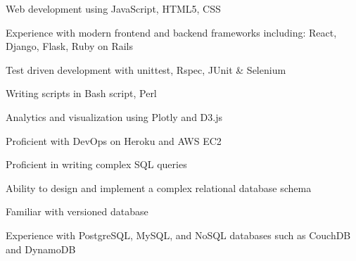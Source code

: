 




\begin{cvparagraph}

      \begin{cvitems}
        \item Web development using JavaScript, HTML5, CSS
        \item Experience with modern frontend and backend frameworks including: React, Django, Flask, Ruby on Rails
        \item Test driven development with unittest, Rspec, JUnit \& Selenium
        \item Writing scripts in Bash script, Perl
        \item Analytics and visualization using Plotly and D3.js
        \item Proficient with DevOps on Heroku and AWS EC2
      \end{cvitems}

\end{cvparagraph}




\begin{cvparagraph}

      \begin{cvitems}
        \item Proficient in writing complex SQL queries
        \item Ability to design and implement a complex relational database schema
        \item Familiar with versioned database
        \item Experience with PostgreSQL, MySQL, and NoSQL databases such as CouchDB and DynamoDB
      \end{cvitems}

\end{cvparagraph}


